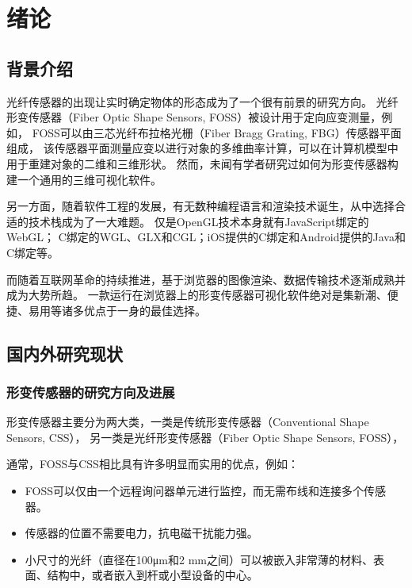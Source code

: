 \cleardoublepage

\section{绪论}

\subsection{背景介绍}

光纤传感器的出现让实时确定物体的形态成为了一个很有前景的研究方向\cite{recent-dev-in-foss}。
光纤形变传感器（Fiber Optic Shape Sensors, FOSS）被设计用于定向应变测量，例如，
FOSS可以由三芯光纤布拉格光栅（Fiber Bragg Grating, FBG）传感器平面组成，
该传感器平面测量应变以进行对象的多维曲率计算，可以在计算机模型中用于重建对象的二维和三维形状。
然而，未闻有学者研究过如何为形变传感器构建一个通用的三维可视化软件。

另一方面，随着软件工程的发展，有无数种编程语言和渲染技术诞生，从中选择合适的技术栈成为了一大难题。
仅是OpenGL\cite{opengl}技术本身就有JavaScript绑定的WebGL\cite{webgl}；
C绑定的WGL、GLX和CGL；iOS提供的C绑定和Android提供的Java和C绑定等。

而随着互联网革命的持续推进，基于浏览器的图像渲染、数据传输技术逐渐成熟并成为大势所趋。
一款运行在浏览器上的形变传感器可视化软件绝对是集新潮、便捷、易用等诸多优点于一身的最佳选择。

\subsection{国内外研究现状}

\subsubsection{形变传感器的研究方向及进展}

形变传感器主要分为两大类，一类是传统形变传感器（Conventional Shape Sensors, CSS），
另一类是光纤形变传感器（Fiber Optic Shape Sensors, FOSS）， 

通常，FOSS与CSS相比具有许多明显而实用的优点，例如：

\begin{itemize}
\item FOSS可以仅由一个远程询问器单元进行监控，而无需布线和连接多个传感器。
\item 传感器的位置不需要电力，抗电磁干扰能力强。
\item 小尺寸的光纤（直径在100μm和2 mm之间）可以被嵌入非常薄的材料、表面、结构中，或者嵌入到杆或小型设备的中心。
\end{itemize}

